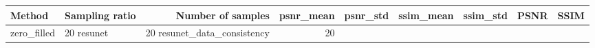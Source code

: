 \begin{tabular}{llrrrrrll}
\toprule
Method & Sampling ratio & Number of samples & psnr_mean & psnr_std & ssim_mean & ssim_std & PSNR & SSIM \\
\midrule
zero_filled & 20%
resunet & 20%
resunet_data_consistency & 20%
\bottomrule
\end{tabular}
